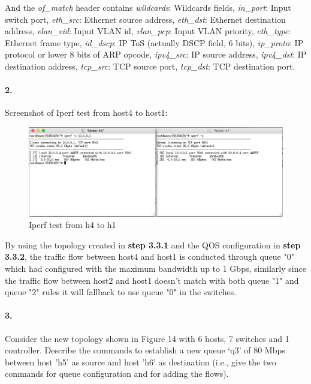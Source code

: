 \documentclass[a4paper]{article}
\begin{document}
And the \emph{of\_match} header contains \emph{wildcards}: Wildcards fields, \emph{in\_port}: Input switch port, \emph{eth\_src}: Ethernet source address, \emph{eth\_dst}: Ethernet destination address, \emph{vlan\_vid}: Input VLAN id, \emph{vlan\_pcp}: Input VLAN priority, \emph{eth\_type}: Ethernet frame type, \emph{id\_dscp}: IP ToS (actually DSCP field, 6 bits), \emph{ip\_proto}: IP protocol or lower 8 bits of ARP opcode, \emph{ipv4\_src}: IP source address, \emph{ipv4\_dst}: IP destination address, \emph{tcp\_src}: TCP source port, \emph{tcp\_dst}: TCP destination port.


\paragraph{2. } Screenshot of Iperf test from host4 to host1:
\begin{figure}[H]
  \centering
    \includegraphics[scale=.47]{iperf_h4_h1.png}
  \caption{Iperf test from h4 to h1}
\end{figure}

By using the topology created in \textbf{step 3.3.1} and the QOS configuration in \textbf{step 3.3.2}, the traffic flow between host4 and host1 is conducted through queue "0" which had configured with the maximum bandwidth up to 1 Gbps, similarly since the traffic flow between host2 and host1 doesn't match with both queue "1" and queue "2" rules it will fallback to use queue "0" in the switches.


\paragraph{3. } Consider the new topology shown in Figure 14 with 6 hosts, 7 switches and 1 controller. Describe the commands to establish a new queue ‘q3’ of 80 Mbps between host 'h5' as source and host 'h6' as destination (i.e., give the two commands for queue configuration and for adding the flows).
\end{document}
